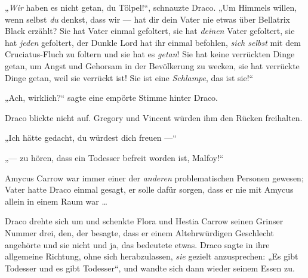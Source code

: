 „\emph{Wir} haben es nicht getan, du Tölpel!“, schnauzte Draco.
„Um Himmels willen, wenn selbst \emph{du} denkst, dass wir — hat dir dein Vater nie etwas über Bellatrix Black erzählt? Sie hat Vater einmal gefoltert, sie hat \emph{deinen} Vater gefoltert, sie hat \emph{jeden} gefoltert, der Dunkle Lord hat ihr einmal befohlen, \emph{sich selbst} mit dem Cruciatus-Fluch zu foltern und sie hat es \emph{getan}! Sie hat keine verrückten Dinge getan, um Angst und Gehorsam in der Bevölkerung zu wecken, sie hat verrückte Dinge getan, weil sie verrückt ist! Sie ist eine \emph{Schlampe}, das ist sie!“

„Ach, wirklich?“ sagte eine empörte Stimme hinter Draco.

Draco blickte nicht auf. Gregory und Vincent würden ihm den Rücken freihalten.

„Ich hätte gedacht, du würdest dich freuen —“

„— zu hören, dass ein Todesser befreit worden ist, Malfoy!“

Amycus Carrow war immer einer der \emph{anderen} problematischen Personen gewesen; Vater hatte Draco einmal gesagt, er solle dafür sorgen, dass er nie mit Amycus allein in einem Raum war …

Draco drehte sich um und schenkte Flora und Hestia Carrow seinen Grinser Nummer drei, den, der besagte, dass er einem Altehrwürdigen Geschlecht angehörte und sie nicht und ja, das bedeutete etwas. Draco sagte in ihre allgemeine Richtung, ohne sich herabzulassen, \emph{sie} gezielt anzusprechen:
„Es gibt Todesser und es gibt Todesser“, und wandte sich dann wieder seinem Essen zu.

